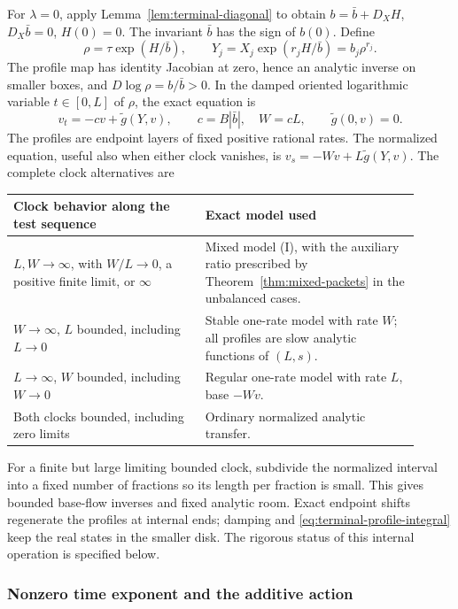 For \(\lambda=0\), apply Lemma~\ref{lem:terminal-diagonal} to obtain
\(b=\bar b+D_XH\), \(D_X\bar b=0\), \(H(0)=0\).  The invariant
\(\bar b\) has the sign of \(b(0)\).  Define
\begin{equation}\label{eq:terminal-rho}
 \rho=\tau\exp(H/\bar b),\qquad
 Y_j=X_j\exp(r_jH/\bar b)=b_j\rho^{r_j}.
\end{equation}
The profile map has identity Jacobian at zero, hence an analytic inverse on
smaller boxes, and
\(D\log\rho=b/\bar b>0\).  In the damped oriented logarithmic variable
\(t\in[0,L]\) of \(\rho\), the exact equation is
\begin{equation}\label{eq:terminal-simple-mixed}
 v_t=-c v+\widetilde g(Y,v),\qquad
 c=B|\bar b|,\quad W=cL,
 \qquad \widetilde g(0,v)=0.
\end{equation}
The profiles are endpoint layers of fixed positive rational rates.
The normalized equation, useful also when either clock vanishes, is
\(v_s=-Wv+L\widetilde g(Y,v)\).  The complete clock alternatives are
\begin{center}
\begin{tabular}{p{0.43\linewidth}p{0.48\linewidth}}
\hline
Clock behavior along the test sequence & Exact model used \\
\hline
\(L,W\to\infty\), with \(W/L\to0\), a positive finite limit,
or \(\infty\) & Mixed model (I), with the auxiliary ratio prescribed by
Theorem~\ref{thm:mixed-packets} in the unbalanced cases. \\
\(W\to\infty\), \(L\) bounded, including \(L\to0\)
& Stable one-rate model with rate \(W\); all profiles are slow analytic
functions of \((L,s)\). \\
\(L\to\infty\), \(W\) bounded, including \(W\to0\)
& Regular one-rate model with rate \(L\), base \(-Wv\). \\
Both clocks bounded, including zero limits
& Ordinary normalized analytic transfer. \\
\hline
\end{tabular}
\end{center}
For a finite but large limiting bounded clock, subdivide the normalized
interval into a fixed number of fractions so its length per fraction is
small.  This gives bounded base-flow inverses and fixed analytic room.
Exact endpoint shifts regenerate the profiles at internal ends; damping and
\eqref{eq:terminal-profile-integral} keep the real states in the smaller
disk.  The rigorous status of this internal operation is specified below.

\subsubsection{Nonzero time exponent and the additive action}


